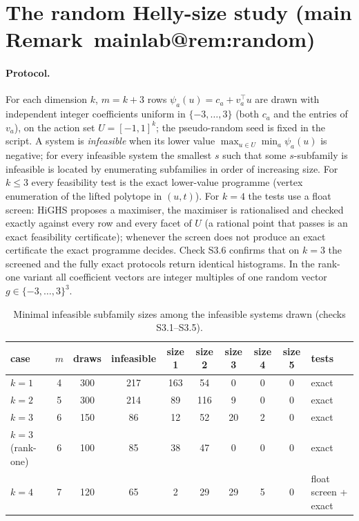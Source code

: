 \documentclass[11pt,a4paper]{article}
\makeatletter
\theoremstyle{plain}
\theoremstyle{definition}
\theoremstyle{remark}
\newcommand{\mref}[1]{\csname mainlab@#1\endcsname}
\makeatother
\begin{document}
\section{The random Helly-size study (main Remark~\mref{rem:random})}\label{si:random}

\paragraph{Protocol.} For each dimension $k$, $m=k+3$ rows $\psi_a(u)=c_a+v_a^\top u$ are drawn with independent integer coefficients uniform in $\{-3,\dots,3\}$ (both $c_a$ and the entries of $v_a$), on the action set $U=[-1,1]^k$; the pseudo-random seed is fixed in the script. A system is \emph{infeasible} when its lower value $\max_{u\in U}\min_a\psi_a(u)$ is negative; for every infeasible system the smallest $s$ such that some $s$-subfamily is infeasible is located by enumerating subfamilies in order of increasing size. For $k\le3$ every feasibility test is the exact lower-value programme (vertex enumeration of the lifted polytope in $(u,t)$). For $k=4$ the tests use a float screen: HiGHS proposes a maximiser, the maximiser is rationalised and checked exactly against every row and every facet of $U$ (a rational point that passes is an exact feasibility certificate); whenever the screen does not produce an exact certificate the exact programme decides. Check S3.6 confirms that on $k=3$ the screened and the fully exact protocols return identical histograms. In the rank-one variant all coefficient vectors are integer multiples of one random vector $g\in\{-3,\dots,3\}^3$.

\begin{table}[H]
\centering\footnotesize
\caption{Minimal infeasible subfamily sizes among the infeasible systems drawn (checks S3.1--S3.5).}
\begin{tabular}{lccccccccl}
\toprule
case & $m$ & draws & infeasible & size 1 & size 2 & size 3 & size 4 & size 5 & tests\\
\midrule
$k=1$ & 4 & 300 & 217 & 163 & 54 & 0 & 0 & 0 & exact\\
$k=2$ & 5 & 300 & 214 & 89 & 116 & 9 & 0 & 0 & exact\\
$k=3$ & 6 & 150 & 86 & 12 & 52 & 20 & 2 & 0 & exact\\
$k=3$ (rank-one) & 6 & 100 & 85 & 38 & 47 & 0 & 0 & 0 & exact\\
$k=4$ & 7 & 120 & 65 & 2 & 29 & 29 & 5 & 0 & float screen + exact\\
\bottomrule
\end{tabular}
\end{table}
\end{document}

